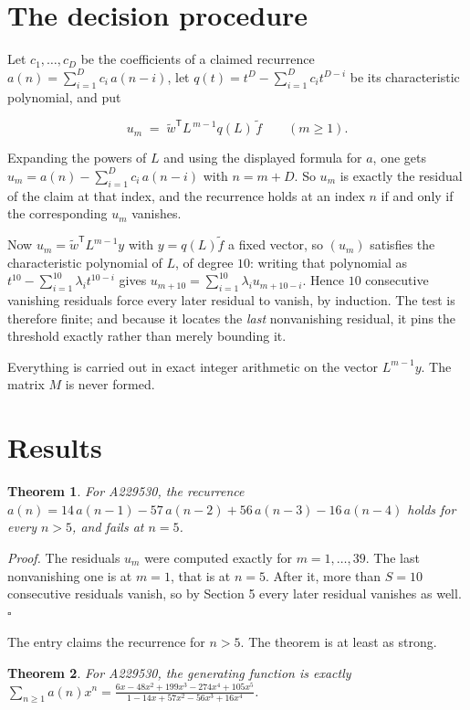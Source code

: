 \documentclass[11pt]{article}
\newtheorem{theorem}{Theorem}
\theoremstyle{definition}
\begin{document}
\section{The decision procedure}

Let $c_1,\dots,c_D$ be the coefficients of a claimed recurrence $a(n) = \sum_{i=1}^{D} c_i\,a(n-i)$, let $q(t) = t^{D} - \sum_{i=1}^{D} c_i t^{D-i}$ be its characteristic polynomial, and put

\[u_m \;=\; \tilde w^{\mathsf T} L^{\,m-1} q(L)\,\tilde f \qquad (m \ge 1).\]

Expanding the powers of $L$ and using the displayed formula for $a$, one gets $u_m = a(n) - \sum_{i=1}^{D} c_i\,a(n-i)$ with $n = m + D$. So $u_m$ is exactly the residual of the claim at that index, and the recurrence holds at an index $n$ if and only if the corresponding $u_m$ vanishes.

Now $u_m = \tilde w^{\mathsf T} L^{m-1} y$ with $y = q(L)\tilde f$ a fixed vector, so $(u_m)$ satisfies the characteristic polynomial of $L$, of degree $10$: writing that polynomial as $t^{10} - \sum_{i=1}^{10} \lambda_i t^{10-i}$ gives $u_{m+10} = \sum_{i=1}^{10} \lambda_i u_{m+10-i}$. Hence $10$ consecutive vanishing residuals force every later residual to vanish, by induction. The test is therefore finite; and because it locates the {\itshape last} nonvanishing residual, it pins the threshold exactly rather than merely bounding it.

Everything is carried out in exact integer arithmetic on the vector $L^{m-1}y$. The matrix $M$ is never formed.

\section{Results}

\begin{theorem} For A229530, the recurrence $a(n) = 14\,a(n-1) - 57\,a(n-2) + 56\,a(n-3) - 16\,a(n-4)$ holds for every $n > 5$, and fails at $n = 5$.\end{theorem}

{\itshape Proof.} The residuals $u_m$ were computed exactly for $m = 1,\dots,39$. The last nonvanishing one is at $m = 1$, that is at $n = 5$. After it, more than $S = 10$ consecutive residuals vanish, so by Section 5 every later residual vanishes as well. $\square$

The entry claims the recurrence for $n > 5$. The theorem is at least as strong.

\begin{theorem} For A229530, the generating function is exactly $\sum_{n\ge 1} a(n)x^n = \frac{6x - 48x^{2} + 199x^{3} - 274x^{4} + 105x^{5}}{1 - 14x + 57x^{2} - 56x^{3} + 16x^{4}}$.\end{theorem}
\end{document}

